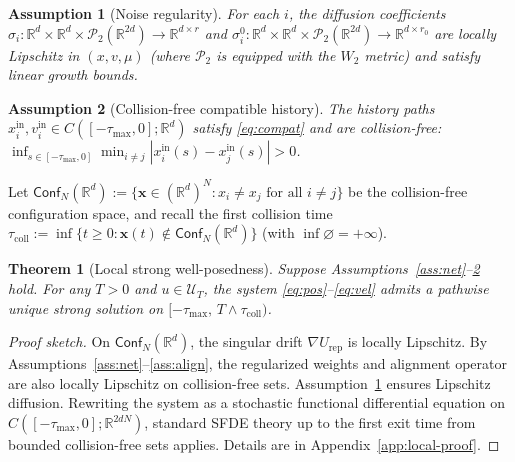 \documentclass[pdflatex,sn-mathphys-num]{sn-jnl}%
\numberwithin{equation}{section}
\theoremstyle{thmstyleone}%
\newtheorem{theorem}{Theorem}
\newtheorem{assumption}{Assumption}
\theoremstyle{remark}
\theoremstyle{definition}
\newcommand{\R}{\mathbb{R}}
\newcommand{\calU}{\mathcal{U}}
\newcommand{\calP}{\mathcal{P}}
\begin{document}
\begin{assumption}[Noise regularity]\label{ass:noise}
For each $i$, the diffusion coefficients
$\sigma_i:\R^d\times\R^d\times\calP_2(\R^{2d})\to\R^{d\times r}$ and
$\sigma_i^0:\R^d\times\R^d\times\calP_2(\R^{2d})\to\R^{d\times r_0}$ are
locally Lipschitz in $(x,v,\mu)$ (where $\calP_2$ is equipped with the
$W_2$ metric) and satisfy linear growth bounds.
\end{assumption}
\begin{assumption}[Collision-free compatible history]\label{ass:hist}
The history paths
$x_i^{\mathrm{in}},v_i^{\mathrm{in}} \in C([-\tau_{\max},0];\R^d)$ satisfy
\eqref{eq:compat} and are collision-free:
$\inf_{s\in[-\tau_{\max},0]}\min_{i\neq j}
|x_i^{\mathrm{in}}(s)-x_j^{\mathrm{in}}(s)|>0$.
\end{assumption}

Let $\mathsf{Conf}_N(\R^d) := \{ \mathbf{x}\in(\R^d)^N : x_i\neq x_j \text{ for all } i\neq j \}$
be the collision-free configuration space, and recall the first collision
time
$\tau_{\mathrm{coll}} := \inf\{ t\ge 0 : \mathbf{x}(t)\notin\mathsf{Conf}_N(\R^d) \}$
(with $\inf\varnothing=+\infty$).
\begin{theorem}[Local strong well-posedness]\label{thm:local}
Suppose Assumptions~\ref{ass:net}--\ref{ass:hist} hold. For any $T>0$ and
$u\in\calU_T$, the system \eqref{eq:pos}--\eqref{eq:vel} admits a pathwise
unique strong solution on $[-\tau_{\max},\,T\wedge\tau_{\mathrm{coll}})$.
\end{theorem}
\begin{proof}[Proof sketch]
On $\mathsf{Conf}_N(\R^d)$, the singular drift $\nabla U_{\mathrm{rep}}$ is
locally Lipschitz. By Assumptions~\ref{ass:net}--\ref{ass:align}, the
regularized weights and alignment operator are also locally Lipschitz on
collision-free sets. Assumption~\ref{ass:noise} ensures Lipschitz diffusion.
Rewriting the system as a stochastic functional differential equation on
$C([-\tau_{\max},0];\R^{2dN})$, standard SFDE theory
\cite{mohammed1984stochastic,mao2007stochastic,von2010existence} up to the first
exit time from bounded collision-free sets applies. Details are in Appendix~\ref{app:local-proof}.
\end{proof}
\end{document}
